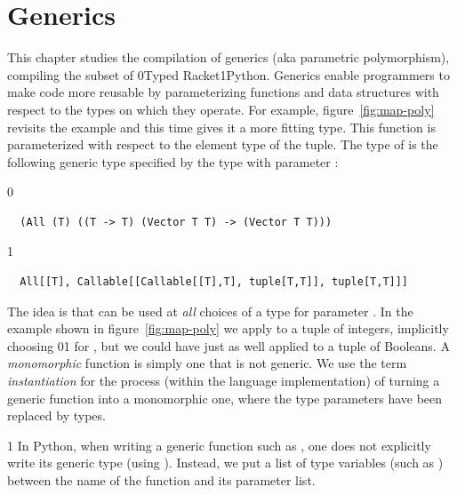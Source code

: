\documentclass[7x10]{TimesAPriori_MIT}%
\def\racketEd{0}
\def\pythonEd{1}
\def\edition{1}
\newcommand{\racket}[1]{{\if\edition\racketEd{#1}\fi}}
\newcommand{\pythonColor}[0]{}
\newcommand{\python}[1]{{\if\edition\pythonEd\pythonColor #1\fi}}
\numberwithin{theorem}{chapter}
\numberwithin{definition}{chapter}
\numberwithin{equation}{chapter}
\begin{document}

\chapter{Generics}
\label{ch:Lpoly}
\setcounter{footnote}{0}

This chapter studies the compilation of
generics (aka parametric
polymorphism), compiling the
\LangPoly{} subset of \racket{Typed Racket}\python{Python}.  Generics
enable programmers to make code more reusable by parameterizing
functions and data structures with respect to the types on which they
operate. For example, figure~\ref{fig:map-poly} revisits the
 example and this time gives it a more fitting type.  This
 function is parameterized with respect to the element type
of the tuple. The type of  is the following generic type
specified by the  type with parameter :
{\if\edition\racketEd
\begin{lstlisting}
  (All (T) ((T -> T) (Vector T T) -> (Vector T T)))
\end{lstlisting}
\fi}
{\if\edition\pythonEd\pythonColor
\begin{lstlisting}
  All[[T], Callable[[Callable[[T],T], tuple[T,T]], tuple[T,T]]]
\end{lstlisting}
\fi}
%
The idea is that  can be used at \emph{all} choices of a
type for parameter . In the example shown in
figure~\ref{fig:map-poly} we apply  to a tuple of integers,
implicitly choosing \racket{}\python{} for
, but we could have just as well applied  to a tuple
of Booleans.
%
A \emph{monomorphic} function is simply one that is not generic.
%
We use the term \emph{instantiation} for the process (within the
language implementation) of turning a generic function into a
monomorphic one, where the type parameters have been replaced by
types.

{\if\edition\pythonEd\pythonColor
%
In Python, when writing a generic function such as , one
does not explicitly write its generic type (using ).
Instead, we put a list of type variables (such as ) between
the name of the function and its parameter list.
%
\fi}
\end{document}
